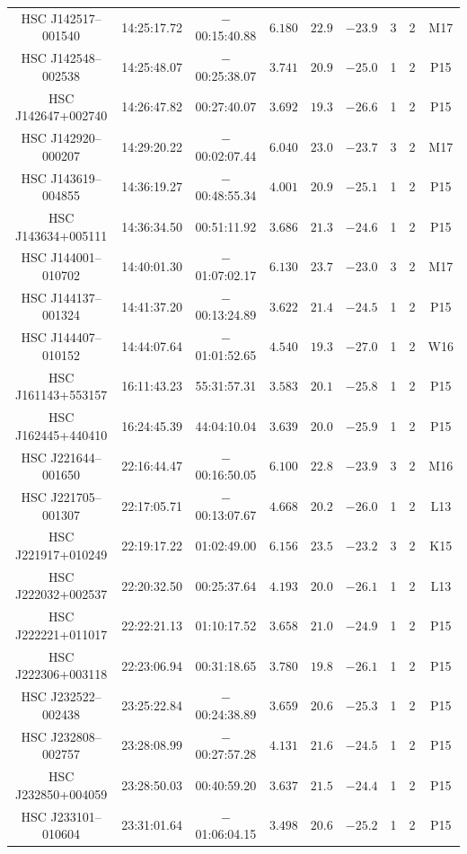 \documentclass[]{pasj01}
\begin{document}
{\begin{longtable}{ccccccccc}
HSC J142517--001540 & 14:25:17.72 & $-$00:15:40.88 & $6.180$ & $22.9$ & $-23.9$ & 3 & 2 & M17 \\
HSC J142548--002538 & 14:25:48.07 & $-$00:25:38.07 & $3.741$ & $20.9$ & $-25.0$ & 1 & 2 & P15 \\
HSC J142647+002740 & 14:26:47.82 & 00:27:40.07 & $3.692$ & $19.3$ & $-26.6$ & 1 & 2 & P15 \\
HSC J142920--000207 & 14:29:20.22 & $-$00:02:07.44 & $6.040$ & $23.0$ & $-23.7$ & 3 & 2 & M17 \\
HSC J143619--004855 & 14:36:19.27 & $-$00:48:55.34 & $4.001$ & $20.9$ & $-25.1$ & 1 & 2 & P15 \\
HSC J143634+005111 & 14:36:34.50 & 00:51:11.92 & $3.686$ & $21.3$ & $-24.6$ & 1 & 2 & P15 \\
HSC J144001--010702 & 14:40:01.30 & $-$01:07:02.17 & $6.130$ & $23.7$ & $-23.0$ & 3 & 2 & M17 \\
HSC J144137--001324 & 14:41:37.20 & $-$00:13:24.89 & $3.622$ & $21.4$ & $-24.5$ & 1 & 2 & P15 \\
HSC J144407--010152 & 14:44:07.64 & $-$01:01:52.65 & $4.540$ & $19.3$ & $-27.0$ & 1 & 2 & W16 \\
HSC J161143+553157 & 16:11:43.23 & 55:31:57.31 & $3.583$ & $20.1$ & $-25.8$ & 1 & 2 & P15 \\
HSC J162445+440410 & 16:24:45.39 & 44:04:10.04 & $3.639$ & $20.0$ & $-25.9$ & 1 & 2 & P15 \\
HSC J221644--001650 & 22:16:44.47 & $-$00:16:50.05 & $6.100$ & $22.8$ & $-23.9$ & 3 & 2 & M16 \\
HSC J221705--001307 & 22:17:05.71 & $-$00:13:07.67 & $4.668$ & $20.2$ & $-26.0$ & 1 & 2 & L13 \\
HSC J221917+010249 & 22:19:17.22 & 01:02:49.00 & $6.156$ & $23.5$ & $-23.2$ & 3 & 2 & K15 \\
HSC J222032+002537 & 22:20:32.50 & 00:25:37.64 & $4.193$ & $20.0$ & $-26.1$ & 1 & 2 & L13 \\
HSC J222221+011017 & 22:22:21.13 & 01:10:17.52 & $3.658$ & $21.0$ & $-24.9$ & 1 & 2 & P15 \\
HSC J222306+003118 & 22:23:06.94 & 00:31:18.65 & $3.780$ & $19.8$ & $-26.1$ & 1 & 2 & P15 \\
HSC J232522--002438 & 23:25:22.84 & $-$00:24:38.89 & $3.659$ & $20.6$ & $-25.3$ & 1 & 2 & P15 \\
HSC J232808--002757 & 23:28:08.99 & $-$00:27:57.28 & $4.131$ & $21.6$ & $-24.5$ & 1 & 2 & P15 \\
HSC J232850+004059 & 23:28:50.03 & 00:40:59.20 & $3.637$ & $21.5$ & $-24.4$ & 1 & 2 & P15 \\
HSC J233101--010604 & 23:31:01.64 & $-$01:06:04.15 & $3.498$ & $20.6$ & $-25.2$ & 1 & 2 & P15 \\
\end{longtable}
}
\end{document}

